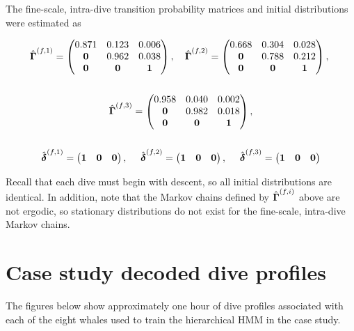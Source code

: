 \documentclass[12pt]{article}
\begin{document}
The fine-scale, intra-dive transition probability matrices and initial distributions were estimated as

\begin{gather}
    \hat {\boldsymbol{\Gamma}}^{(f,1)} = 
    \begin{pmatrix} 
    0.871 & 0.123 & 0.006 \\
    \bf{0} & 0.962 & 0.038 \\
    \bf{0} & \bf{0} & \bf{1}
    \end{pmatrix}, \quad
    \hat {\boldsymbol{\Gamma}}^{(f,2)} = 
    \begin{pmatrix} 
    0.668 & 0.304 & 0.028 \\
    \bf{0} & 0.788 & 0.212 \\
    \bf{0} & \bf{0} & \bf{1}
    \end{pmatrix}, ~
    \\ \nonumber \\
    \hat {\boldsymbol{\Gamma}}^{(f,3)} = 
    \begin{pmatrix} 
    0.958 & 0.040 & 0.002 \\
    \bf{0} & 0.982 & 0.018 \\
    \bf{0} & \bf{0} & \bf{1}
    \end{pmatrix}, \\ \nonumber \\
    \hat {\boldsymbol{\delta}}^{(f,1)} = \begin{pmatrix} \bf{1} & \bf{0} & \bf{0} \end{pmatrix}, \quad ~
    \hat {\boldsymbol{\delta}}^{(f,2)} = \begin{pmatrix} \bf{1} & \bf{0} & \bf{0} \end{pmatrix}, \quad ~
    \hat {\boldsymbol{\delta}}^{(f,3)} = \begin{pmatrix} \bf{1} & \bf{0} & \bf{0} \end{pmatrix}
\end{gather}

Recall that each dive must begin with descent, so all initial distributions are identical. In addition, note that the Markov chains defined by $\hat {\boldsymbol{\Gamma}}^{(f,i)}$ above are not ergodic, so stationary distributions do not exist for the fine-scale, intra-dive Markov chains.

\section{Case study decoded dive profiles}

The figures below show approximately one hour of dive profiles associated with each of the eight whales used to train the hierarchical HMM in the case study.
\end{document}
